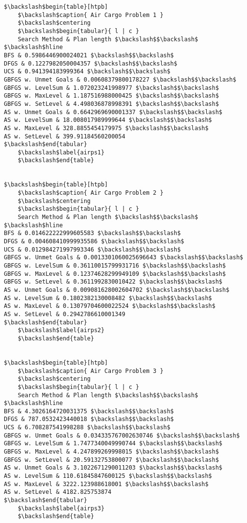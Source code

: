 \documentclass{article}
\begin{document}
\begin{verbatim}$\backslash$begin{table}[htpb]
    $\backslash$caption{ Air Cargo Problem 1 }
    $\backslash$centering
    $\backslash$begin{tabular}{ l | c }
    Search Method & Plan length $\backslash$$\backslash$ $\backslash$hline 
BFS & 0.5986446900024021 $\backslash$$\backslash$
DFGS & 0.1227982050004357 $\backslash$$\backslash$
UCS & 0.941394183999364 $\backslash$$\backslash$
GBFGS w. Unmet Goals & 0.00608379800178227 $\backslash$$\backslash$
GBFGS w. LevelSum & 1.072023241998977 $\backslash$$\backslash$
GBFGS w. MaxLevel & 1.187516988000425 $\backslash$$\backslash$
GBFGS w. SetLevel & 4.498036878998391 $\backslash$$\backslash$
AS w. Unmet Goals & 0.6642969690001337 $\backslash$$\backslash$
AS w. LevelSum & 18.008017989999644 $\backslash$$\backslash$
AS w. MaxLevel & 328.8855454179975 $\backslash$$\backslash$
AS w. SetLevel & 399.91184560200054
$\backslash$end{tabular}
    $\backslash$label{airps1}
    $\backslash$end{table}

    
$\backslash$begin{table}[htpb]
    $\backslash$caption{ Air Cargo Problem 2 }
    $\backslash$centering
    $\backslash$begin{tabular}{ l | c }
    Search Method & Plan length $\backslash$$\backslash$ $\backslash$hline 
BFS & 0.014622222999605583 $\backslash$$\backslash$
DFGS & 0.004608410999935586 $\backslash$$\backslash$
UCS & 0.012984271997993346 $\backslash$$\backslash$
GBFGS w. Unmet Goals & 0.0013301060025696643 $\backslash$$\backslash$
GBFGS w. LevelSum & 0.36110015799931716 $\backslash$$\backslash$
GBFGS w. MaxLevel & 0.12374628299949109 $\backslash$$\backslash$
GBFGS w. SetLevel & 0.3611992830010422 $\backslash$$\backslash$
AS w. Unmet Goals & 0.009081628002604702 $\backslash$$\backslash$
AS w. LevelSum & 0.1802382130008482 $\backslash$$\backslash$
AS w. MaxLevel & 0.13079704600022524 $\backslash$$\backslash$
AS w. SetLevel & 0.2942786610001349
$\backslash$end{tabular}
    $\backslash$label{airps2}
    $\backslash$end{table}

    
$\backslash$begin{table}[htpb]
    $\backslash$caption{ Air Cargo Problem 3 }
    $\backslash$centering
    $\backslash$begin{tabular}{ l | c }
    Search Method & Plan length $\backslash$$\backslash$ $\backslash$hline 
BFS & 4.3026164720031375 $\backslash$$\backslash$
DFGS & 787.0532423440018 $\backslash$$\backslash$
UCS & 6.708287541998288 $\backslash$$\backslash$
GBFGS w. Unmet Goals & 0.034335767002630746 $\backslash$$\backslash$
GBFGS w. LevelSum & 1.7477340049990744 $\backslash$$\backslash$
GBFGS w. MaxLevel & 4.247899269998015 $\backslash$$\backslash$
GBFGS w. SetLevel & 20.59132753800077 $\backslash$$\backslash$
AS w. Unmet Goals & 3.1022671290011203 $\backslash$$\backslash$
AS w. LevelSum & 110.61845847600125 $\backslash$$\backslash$
AS w. MaxLevel & 3222.123988618001 $\backslash$$\backslash$
AS w. SetLevel & 4182.825753874
$\backslash$end{tabular}
    $\backslash$label{airps3}
    $\backslash$end{table}


\end{verbatim}
\end{document}
